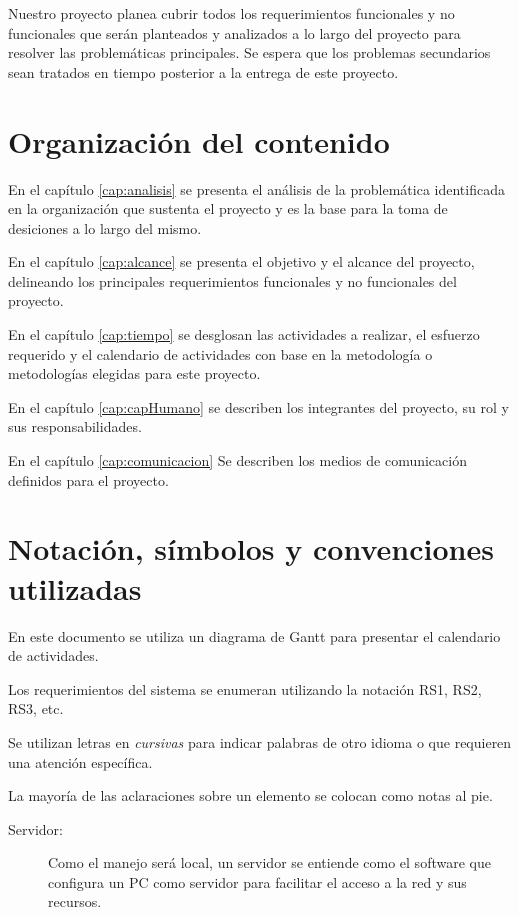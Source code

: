 Nuestro proyecto planea cubrir todos los requerimientos funcionales y no funcionales que serán planteados y analizados a lo largo del proyecto para resolver las problemáticas principales. Se espera que los problemas secundarios sean tratados en tiempo posterior a la entrega de este proyecto.
	
\section{Organización del contenido}

En el capítulo \ref{cap:analisis} se presenta el análisis de la problemática identificada en la organización que sustenta el proyecto y es la base para la toma de desiciones a lo largo del mismo.
	
En el capítulo \ref{cap:alcance} se presenta el objetivo y el alcance del proyecto, delineando los principales requerimientos funcionales y no funcionales del proyecto.
	
En el capítulo \ref{cap:tiempo} se desglosan las actividades a realizar, el esfuerzo requerido y el calendario de actividades con base en la metodología o metodologías elegidas para este proyecto.
	
En el capítulo \ref{cap:capHumano} se describen los integrantes del proyecto, su rol y sus responsabilidades.
	
En el capítulo \ref{cap:comunicacion} Se describen los medios de comunicación definidos para el proyecto.

\section{Notación, símbolos y convenciones utilizadas}

En este documento se utiliza un diagrama de Gantt para presentar el calendario de actividades.
	
Los requerimientos del sistema se enumeran utilizando la notación RS1, RS2, RS3, etc.
	
Se utilizan letras en {\em cursivas} para indicar palabras de otro idioma o que requieren una atención específica. 
	
La mayoría de las aclaraciones sobre un elemento se colocan como notas al pie.
	
\begin{description}
	\item[Servidor:] Como el manejo será local, un servidor se entiende como el software que configura un PC como servidor para facilitar el acceso a la red y sus recursos.
\end{description}

